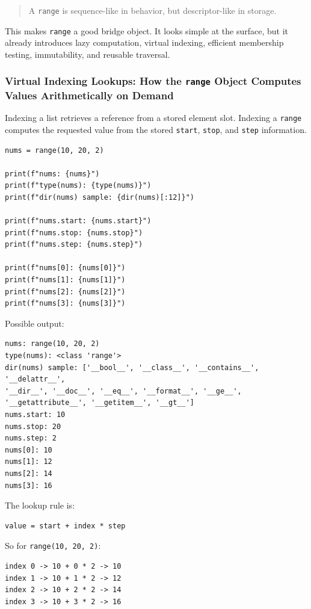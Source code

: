 \documentclass[a4paper,twoside]{report}
\begin{document}
\begin{quote}
A \texttt{range} is sequence-like in behavior, but descriptor-like in storage.
\end{quote}

This makes \texttt{range} a good bridge object. It looks simple at the surface, but it already introduces lazy computation, virtual indexing, efficient membership testing, immutability, and reusable traversal.

\subsubsection{Virtual Indexing Lookups: How the \texttt{range} Object Computes Values Arithmetically on Demand}

Indexing a list retrieves a reference from a stored element slot. Indexing a \texttt{range} computes the requested value from the stored \texttt{start}, \texttt{stop}, and \texttt{step} information.

\begin{verbatim}
nums = range(10, 20, 2)

print(f"nums: {nums}")
print(f"type(nums): {type(nums)}")
print(f"dir(nums) sample: {dir(nums)[:12]}")

print(f"nums.start: {nums.start}")
print(f"nums.stop: {nums.stop}")
print(f"nums.step: {nums.step}")

print(f"nums[0]: {nums[0]}")
print(f"nums[1]: {nums[1]}")
print(f"nums[2]: {nums[2]}")
print(f"nums[3]: {nums[3]}")
\end{verbatim}

Possible output:

\begin{verbatim}
nums: range(10, 20, 2)
type(nums): <class 'range'>
dir(nums) sample: ['__bool__', '__class__', '__contains__', '__delattr__',
'__dir__', '__doc__', '__eq__', '__format__', '__ge__',
'__getattribute__', '__getitem__', '__gt__']
nums.start: 10
nums.stop: 20
nums.step: 2
nums[0]: 10
nums[1]: 12
nums[2]: 14
nums[3]: 16
\end{verbatim}

The lookup rule is:

\begin{verbatim}
value = start + index * step
\end{verbatim}

So for \texttt{range(10, 20, 2)}:

\begin{verbatim}
index 0 -> 10 + 0 * 2 -> 10
index 1 -> 10 + 1 * 2 -> 12
index 2 -> 10 + 2 * 2 -> 14
index 3 -> 10 + 3 * 2 -> 16
\end{verbatim}
\end{document}
